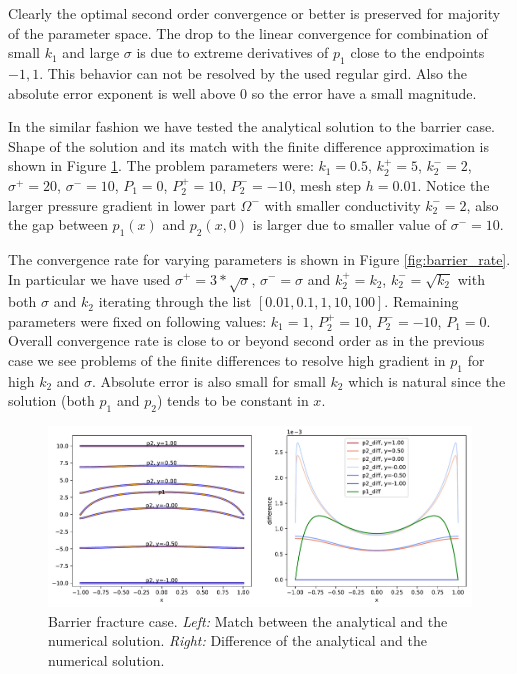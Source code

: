 \documentclass[a4paper,10pt]{article}
\begin{document}
Clearly the optimal second order convergence or better is preserved for majority of the parameter space. The drop to the linear convergence for combination 
of small $k_1$ and large $\sigma$ is due to extreme derivatives of $p_1$ close to the endpoints ${-1, 1}$. This behavior can not be resolved by the used regular gird.
Also the absolute error exponent is well above $0$ so the error have a small magnitude. 

In the similar fashion we have tested the analytical solution to the barrier case. Shape of the solution and its match with the finite difference approximation 
is shown in Figure \ref{fig:barrier_solution}. The problem parameters were: $k_1=0.5$, $k_2^+=5$, $k_2^-=2$, $\sigma^+=20$, $\sigma^-=10$, $P_1=0$, 
$P_2^+=10$, $P_2^-=-10$, mesh step $h=0.01$. Notice the larger pressure gradient in lower part $\Omega^-$ with smaller conductivity $k_2^- = 2$, also the gap between 
$p_1(x)$ and $p_2(x, 0)$ is larger due to smaller value of $\sigma^- = 10$. 

The convergence rate for varying parameters is shown in Figure \ref{fig:barrier_rate}. In particular we have used $\sigma^+ = 3*\sqrt{\sigma}$, $\sigma^- = \sigma$
and $k_2^+ = k_2$, $k_2^- = \sqrt{k_2}$ with both $\sigma$ and $k_2$ iterating through the list $[0.01, 0.1, 1, 10, 100]$. Remaining parameters were fixed on 
following values: $k_1=1$, $P_2^+=10$, $P_2^-=-10$, $P_1=0$. Overall convergence rate is close to or beyond second order as in the previous case we see problems 
of the finite differences to resolve high gradient in $p_1$ for high $k_2$ and $\sigma$. Absolute error is also small for small $k_2$ which is natural since the 
solution (both $p_1$ and $p_2$) tends to be constant in $x$. 

\begin{figure}
  \label{fig:barrier_solution}
  \centering
  \includegraphics[width=\textwidth, keepaspectratio=true]{./barrier_solution.pdf}
  \caption{Barrier fracture case.
  {\it Left:} Match between the analytical and the numerical solution. 
  {\it Right:} Difference of the analytical and the numerical solution.}
\end{figure}
\end{document}
